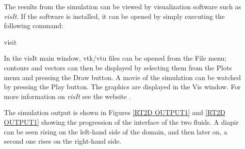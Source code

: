 %
%
The results from the simulation can be viewed by visualization software such as \textit{visIt}. If the software is installed, it can be opened by simply executing the following command:
%
\begin{python}
visit
\end{python}
%
In the visIt main window, vtk/vtu files can be opened from the File menu; contours and vectors can then be displayed by selecting them from the Plots menu and pressing the Draw button. A movie of the simulation can be watched by pressing the Play button. The graphics are displayed in the Vis window. For more information on \textit{visIt} see the website \cite{VisIt}.

The simulation output is shown in Figures \ref{RT2D OUTPUT1} and \ref{RT2D OUTPUT1} showing the progression of the interface of the two fluids. A diapir can be seen rising on the left-hand side of the domain, and then later on, a second one rises on the right-hand side.
